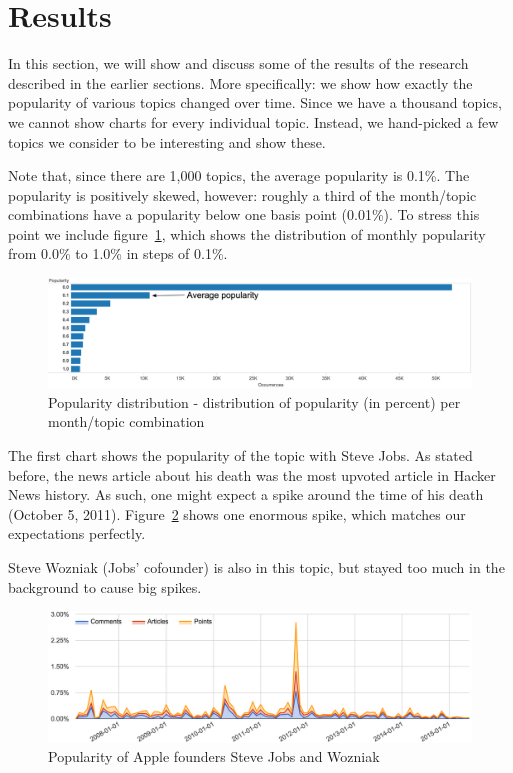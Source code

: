 \section{Results}
\label{sec:results}
In this section, we will show and discuss some of the results of the research described in the earlier sections. More specifically: we show how exactly the popularity of various topics changed over time. Since we have a thousand topics, we cannot show charts for every individual topic. Instead, we hand-picked a few topics we consider to be interesting and show these. 

Note that, since there are 1,000 topics, the average popularity is 0.1\%. The popularity is positively skewed, however: roughly a third of the month/topic combinations have a popularity below one basis point (0.01\%). To stress this point we include figure~\ref{fig:popularitydistribution}, which shows the distribution of monthly popularity from 0.0\% to 1.0\% in steps of 0.1\%.

\begin{figure}[H]
	\caption{Popularity distribution - distribution of popularity (in percent) per month/topic combination}
	\label{fig:popularitydistribution}
	\centering
	\includegraphics[width=14cm]{popularity_distribution}
\end{figure}

The first chart shows the popularity of the topic with Steve Jobs. As stated before, the news article about his death was the most upvoted article in Hacker News history. As such, one might expect a spike around the time of his death (October 5, 2011). Figure~\ref{fig:trend_jobs} shows one enormous spike, which matches our expectations perfectly.

Steve Wozniak (Jobs' cofounder) is also in this topic, but stayed too much in the background to cause big spikes.
\begin{figure}[H] %
	\caption{Popularity of Apple founders Steve Jobs and Wozniak}
	\label{fig:trend_jobs}
	\centering
	\includegraphics[width=14cm]{topic_trends/jobs_relative}
\end{figure}

